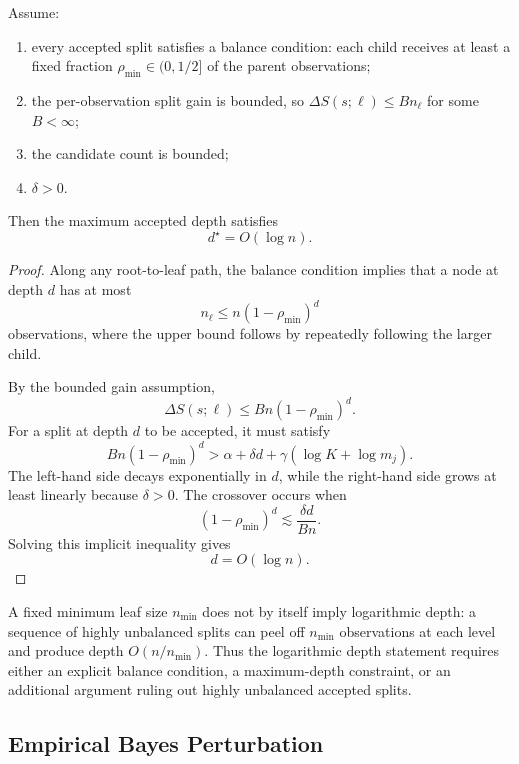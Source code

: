 \begin{lemma}
\label{lem:depth_bound}
Assume:
\begin{enumerate}[label=(\roman*)]
    \item every accepted split satisfies a balance condition: each child receives at least a fixed fraction $\rho_{\min}\in(0,1/2]$ of the parent observations;
    \item the per-observation split gain is bounded, so $\Delta S(s;\ell)\le B n_\ell$ for some $B<\infty$;
    \item the candidate count is bounded;
    \item $\delta>0$.
\end{enumerate}
Then the maximum accepted depth satisfies
\[
d^\star = O(\log n).
\]
\end{lemma}

\begin{proof}
Along any root-to-leaf path, the balance condition implies that a node at depth $d$ has at most
\[
n_\ell
\le
n(1-\rho_{\min})^d
\]
observations, where the upper bound follows by repeatedly following the larger child.

By the bounded gain assumption,
\[
\Delta S(s;\ell)
\le
B n(1-\rho_{\min})^d.
\]
For a split at depth $d$ to be accepted, it must satisfy
\[
B n(1-\rho_{\min})^d
>
\alpha
+
\delta d
+
\gamma(\log K+\log m_j).
\]
The left-hand side decays exponentially in $d$, while the right-hand side grows at least linearly because $\delta>0$.
The crossover occurs when
\[
(1-\rho_{\min})^d
\lesssim
\frac{\delta d}{Bn}.
\]
Solving this implicit inequality gives
\[
d
=
O(\log n).
\]
\end{proof}

\begin{remark}
A fixed minimum leaf size $n_{\min}$ does not by itself imply logarithmic depth: a sequence of highly unbalanced splits can peel off $n_{\min}$ observations at each level and produce depth $O(n/n_{\min})$.
Thus the logarithmic depth statement requires either an explicit balance condition, a maximum-depth constraint, or an additional argument ruling out highly unbalanced accepted splits.
\end{remark}


\subsection{Empirical Bayes Perturbation}
\label{app:eb_perturbation}

